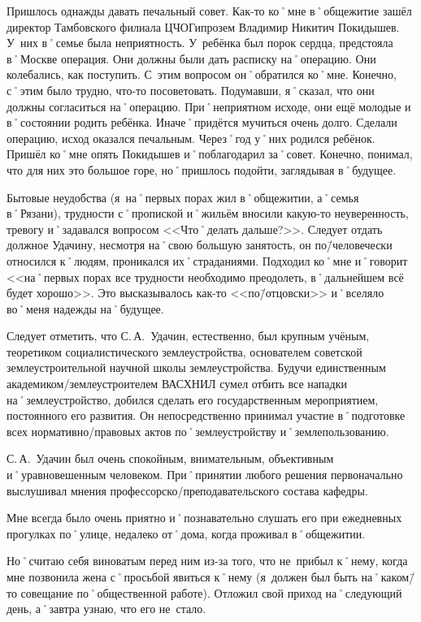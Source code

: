 Пришлось однажды давать печальный совет. Как-то ко˚мне в˚общежитие зашёл директор Тамбовского филиала ЦЧОГипрозем Владимир Никитич Покидышев. У~них в˚семье была неприятность. У~ребёнка был порок сердца, предстояла в˚Москве операция. Они должны были дать расписку на˚операцию. Они колебались, как поступить. С~этим вопросом он˚обратился ко˚мне. Конечно, с˚этим было трудно, что-то посоветовать. Подумавши, я˚сказал, что они должны согласиться на˚операцию. При˚неприятном исходе, они ещё молодые и в˚состоянии родить ребёнка. Иначе˚придётся мучиться очень долго. Сделали операцию, исход оказался печальным. Через˚год у˚них родился ребёнок. Пришёл ко˚мне опять Покидышев и˚поблагодарил за˚совет. Конечно, понимал, что для них это большое горе, но˚пришлось подойти, заглядывая в˚будущее.

Бытовые неудобства (я~на˚первых порах жил в˚общежитии, а˚семья в˚Рязани), трудности с˚пропиской и˚жильём вносили какую-то неуверенность, тревогу и˚задавался вопросом <<Что˚делать дальше?>>. Следует отдать должное Удачину, несмотря на˚свою большую занятость, он по\=/человечески относился к˚людям, проникался их˚страданиями. Подходил ко˚мне и˚говорит <<на˚первых порах все трудности необходимо преодолеть, в˚дальнейшем всё будет хорошо>>. Это высказывалось как-то <<по\=/отцовски>> и˚вселяло во˚меня надежды на˚будущее. 

Следует отметить, что С.\,А.~Удачин, естественно, был крупным учёным, теоретиком социалистического землеустройства, основателем советской землеустроительной научной школы землеустройства. Будучи единственным академиком\-/землеустроителем ВАСХНИЛ сумел отбить все нападки на˚землеустройство, добился сделать его государственным мероприятием, постоянного его развития. Он непосредственно принимал участие в˚подготовке всех нормативно\-/правовых актов по˚землеустройству и˚землепользованию. 

С.\,А.~Удачин был очень спокойным, внимательным, объективным и˚уравновешенным человеком. При˚принятии любого решения первоначально выслушивал мнения профессорско\-/преподавательского состава кафедры. 

Мне всегда было очень приятно и˚познавательно слушать его при ежедневных прогулках по˚улице, недалеко от˚дома, когда проживал в˚общежитии.

Но˚считаю себя виноватым перед ним из-за того, что не~прибыл к˚нему, когда мне позвонила жена с˚просьбой явиться к˚нему (я~должен был быть на˚каком\=/то совещание по˚общественной работе). Отложил свой приход на˚следующий день, а˚завтра узнаю, что его не~стало.

